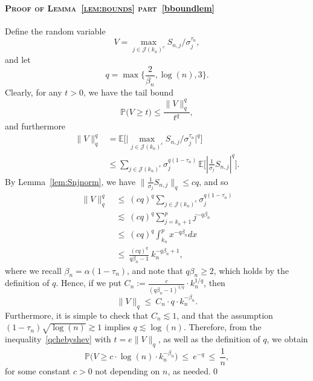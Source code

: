 \documentclass[aos,preprint]{imsart}
\numberwithin{equation}{section}
\theoremstyle{plain}
\newcommand{\J}{\mathcal{J}}
\renewcommand{\P}{\mathbb{P}}
\newcommand{\E}{\mathbb{E}}
\newcommand{\ts}{\textstyle}
\newcommand{\1}{{\bf{1}}}
\newcommand{\0}{\mathbf{0}}
\begin{document}
~\\

\paragraph{\textsc{Proof of Lemma~\ref{lem:bounds} part}~\eqref{bboundlem}} Define the random variable
$$V=\max_{j\in\J(k_n)^c} S_{n,j}/\sigma_j^{\tau_n},$$
%
and let
$$q=\max\big\{\ts\frac{2}{\beta_n}, \log(n), 3\big\}.$$
Clearly, for any $t>0$, we have the tail bound
\begin{equation}\label{qchebyshev}
\P\big( V\geq t)\leq \frac{\|V\|_q^q}{t^q},
\end{equation}
and furthermore
 \begin{equation}
 \begin{split}
  \|V\|_q^q &= \E\bigg[\Big|\max_{j\in\J(k_n)^c} S_{n,j}/\sigma_j^{\tau_n}\Big|^q\bigg]\\[0.3cm]
  &\leq \sum_{j\in\J(k_n)^c} \sigma_j^{q(1-\tau_n)}\,\E\big[|\ts\frac{1}{\sigma_j}S_{n,j}|^q\big].
  \end{split}
 \end{equation}
By Lemma~\ref{lem:Snjnorm}, we have $\|\frac{1}{\sigma_j}S_{n,j}\|_{q}\leq cq$, and so 
%
  \begin{equation}
  \begin{split}
    \|V\|_q^q \ &\leq \  (c q)^q \sum_{j\in\J(k_n)^c} \sigma_j^{q(1-\tau_n)} \\[0.3cm]
  &\lesssim \ (c q)^q \sum_{j=k_n+1}^p j^{-q \beta_n }\\[0.3cm]
  &\leq \ (cq)^q \int_{k_n}^p x^{-q\beta_n} dx\\[0.3cm]
  &\leq \ \ts\frac{(c q)^q }{q \beta_n-1}\ k_n^{-q \beta_n  +1}, 
 \end{split}
 \end{equation}
 where we recall $\beta_n=\alpha(1-\tau_n)$, and note that $ q\beta_n\geq 2$, which holds by the definition of $q$.
Hence, if we put $C_n:=\ts\frac{c}{(q\beta_n -1)^{1/q}} \cdot k_n^{1/q}$, then
$$\|V\|_q \leq \ C_n \cdot q\cdot k_n^{-\beta_n}.$$
Furthermore, it is simple to check that $C_n\lesssim 1$, and that the assumption $(1-\tau_n)\sqrt{\log(n)}\gtrsim 1$ implies
$q\lesssim \log(n).$
Therefore, from the inequality~\eqref{qchebyshev} with $t=e\|V\|_q$, as well as the definition of $q$, we obtain
%
%
$$\P\Bigg(V\geq c\cdot \log(n)\cdot k_n^{-\beta_n}\Bigg) \ \leq \ e^{-q} \ \leq \ \ts\frac 1n,$$
for some constant $c>0$ not depending on $n$, as needed.\qed
\end{document}
